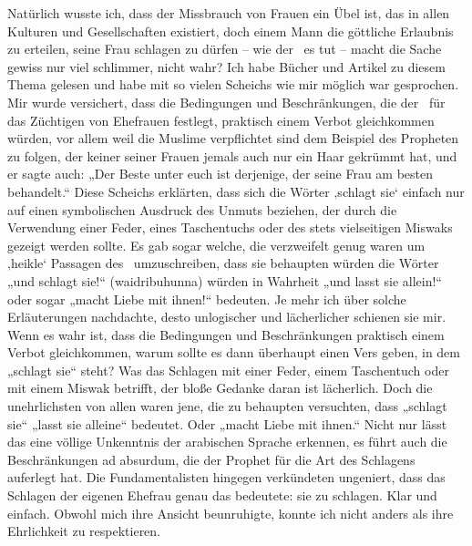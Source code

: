 \documentclass[12pt]{memoir}
\begin{document}
Natürlich wusste ich, dass der Missbrauch von Frauen ein Übel ist,
das in allen Kulturen und Gesellschaften existiert,
doch einem Mann die göttliche Erlaubnis zu erteilen,
seine Frau schlagen zu dürfen – wie der \Quran\ es tut –
macht die Sache gewiss nur viel schlimmer, nicht wahr?
Ich habe Bücher und Artikel zu diesem Thema gelesen
und habe mit so vielen Scheichs wie mir möglich war gesprochen.
Mir wurde versichert, dass die Bedingungen und Beschränkungen,
die der \Quran\ für das Züchtigen von Ehefrauen festlegt,
praktisch einem Verbot gleichkommen würden,
vor allem weil die Muslime verpflichtet sind
dem Beispiel des Propheten zu folgen,
der keiner seiner Frauen jemals auch nur ein Haar gekrümmt hat\fnmarksym[*],
und er sagte auch:
„Der Beste unter euch ist derjenige, der seine Frau am besten behandelt.“
Diese Scheichs erklärten, dass sich die Wörter ‚schlagt sie‘
einfach nur auf einen symbolischen Ausdruck des Unmuts beziehen,
der durch die Verwendung einer Feder, eines Taschentuchs
oder des stets vielseitigen Miswaks gezeigt werden sollte.
Es gab sogar welche,
die verzweifelt genug waren um ‚heikle‘ Passagen des \Quran\ umzuschreiben,
dass sie behaupten würden die Wörter „und schlagt sie!“ (waidribuhunna)
würden in Wahrheit „und lasst sie allein!“
oder sogar „macht Liebe mit ihnen!“ bedeuten.
Je mehr ich über solche Erläuterungen nachdachte,
desto unlogischer und lächerlicher schienen sie mir.
Wenn es wahr ist, dass die Bedingungen und Beschränkungen
praktisch einem Verbot gleichkommen,
warum sollte es dann überhaupt einen Vers geben, in dem „schlagt sie“ steht?
Was das Schlagen mit einer Feder,
einem Taschentuch oder mit einem Miswak betrifft,
der bloße Gedanke daran ist lächerlich.
Doch die unehrlichsten von allen waren jene,
die zu behaupten versuchten, dass „schlagt sie“ „lasst sie alleine“
bedeutet.
Oder „macht Liebe mit ihnen.“
Nicht nur lässt das eine völlige Unkenntnis der arabischen Sprache erkennen,
es führt auch die Beschränkungen ad absurdum,
die der Prophet für die Art des Schlagens auferlegt hat.
Die Fundamentalisten hingegen verkündeten ungeniert,
dass das Schlagen der eigenen Ehefrau genau das bedeutete:
sie zu schlagen. Klar und einfach.
Obwohl mich ihre Ansicht beunruhigte,
konnte ich nicht anders als ihre Ehrlichkeit zu respektieren.

\end{document}
